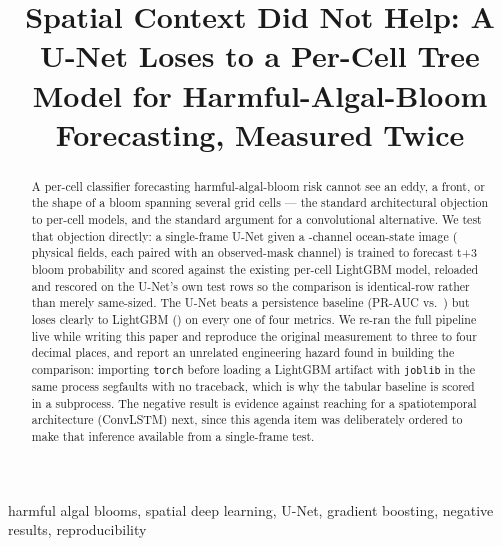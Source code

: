\documentclass[conference]{IEEEtran}
\begin{document}
\title{Spatial Context Did Not Help: A U-Net Loses to a Per-Cell Tree Model
for Harmful-Algal-Bloom Forecasting, Measured Twice}

\author{
}

\maketitle

\begin{abstract}
A per-cell classifier forecasting harmful-algal-bloom risk cannot see an
eddy, a front, or the shape of a bloom spanning several grid cells --- the
standard architectural objection to per-cell models, and the standard
argument for a convolutional alternative. We test that objection directly:
a single-frame U-Net given a \NInputChannels{}-channel ocean-state image
(\NChannels{} physical fields, each paired with an observed-mask channel)
is trained to forecast t+3 bloom probability and scored against the
existing per-cell LightGBM model, reloaded and rescored on the U-Net's own
\NTestRows{} test rows so the comparison is identical-row rather than
merely same-sized. The U-Net beats a persistence baseline (PR-AUC
\UnetPRAUC{} vs.\ \PersistPRAUC{}) but loses clearly to LightGBM
(\LgbmPRAUC{}) on every one of four metrics. We re-ran the full pipeline
live while writing this paper and reproduce the original measurement to
three to four decimal places, and report an unrelated engineering hazard
found in building the comparison: importing \texttt{torch} before loading a
LightGBM artifact with \texttt{joblib} in the same process segfaults with
no traceback, which is why the tabular baseline is scored in a subprocess.
The negative result is evidence against reaching for a spatiotemporal
architecture (ConvLSTM) next, since this agenda item was deliberately
ordered to make that inference available from a single-frame test.
\end{abstract}

\begin{IEEEkeywords}
harmful algal blooms, spatial deep learning, U-Net, gradient boosting,
negative results, reproducibility
\end{IEEEkeywords}


\end{document}
